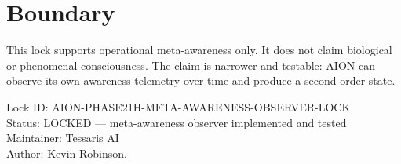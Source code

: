 \documentclass[11pt,a4paper]{article}
\begin{document}
\section{Boundary}

This lock supports operational meta-awareness only. It does not claim biological or phenomenal consciousness. The claim is narrower and testable: AION can observe its own awareness telemetry over time and produce a second-order state.

\bigskip

\noindent
Lock ID: AION-PHASE21H-META-AWARENESS-OBSERVER-LOCK\\
Status: LOCKED --- meta-awareness observer implemented and tested\\
Maintainer: Tessaris AI\\
Author: Kevin Robinson.
\end{document}
